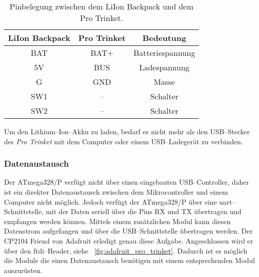 \begin{table}
	\centering
	\begin{tabular}{||c|c|c||} 
		\hline
		LiIon Backpack&Pro Trinket&Bedeutung\\\hline
		\hline
		BAT & BAT+ & Batteriespannung\\\hline
		5V & BUS & Ladespannung\\\hline
		G & GND & Masse\\\hline
		\hline
		SW1 & -- & Schalter\\\hline
		SW2 & -- & Schalter\\\hline
	\end{tabular}
	\caption{Pinbelegung zwischen dem LiIon Backpack und dem Pro Trinket.}
	\label{tab:pin_assignment_between_liion_backpack_and_pro_trinket}
\end{table}

Um den Lithium--Ion--Akku zu laden, bedarf es nicht mehr als den USB--Stecker des \textit{Pro Trinket} mit dem Computer oder einem USB--Ladegerät zu verbinden.


\begin{comment}
------------------------------------------------------------------------------------------
\end{comment}
\subsubsection{Datenaustausch}

Der ATmega328/P verfügt nicht über einen eingebauten USB--Controller, daher ist ein direkter Datenaustausch zwischen dem Mikrocontroller und einem Computer nicht möglich. Jedoch verfügt der ATmega328/P über eine \gls{uart}--Schnittstelle, mit der Daten seriell über die Pins RX und TX übertragen und empfangen werden können. Mittels einem zusätzlichen Modul kann diesen Datenstrom aufgefangen und über die USB--Schnittstelle übertragen werden. Der CP2104 Friend von Adafruit erledigt genau diese Aufgabe. Angeschlossen wird er über den  \gls{ftdi}--Header, siehe \figurename~\ref{fig:adafruit_pro_trinket}. Dadurch ist es möglich die Module die einen Datenaustausch benötigen mit einem entsprechenden Modul auszurüsten.

